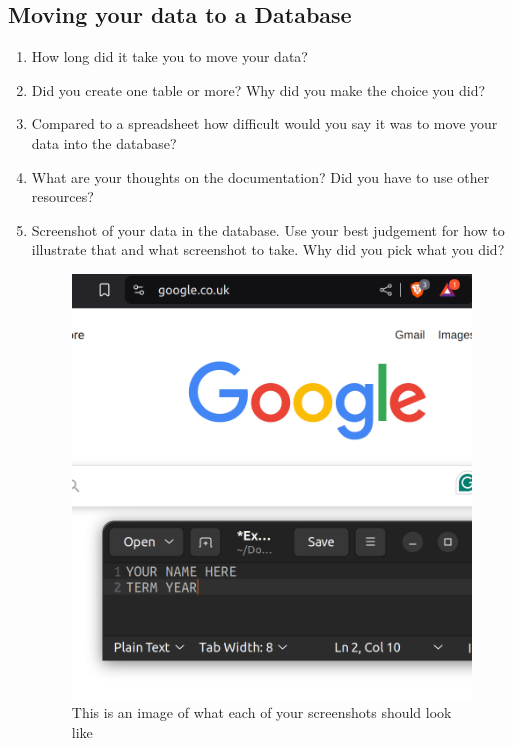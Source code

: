 \documentclass[12pt]{article}
\begin{document}
\subsection*{Moving your data to a Database}
    \begin{enumerate}
        \item How long did it take you to move your data?
        \item Did you create one table or more? Why did you make the choice you did?
        \item Compared to a spreadsheet how difficult would you say it was to move your data into the database?
        \item What are your thoughts on the documentation? Did you have to use other resources? 
        \item Screenshot of your data in the database.  Use your best judgement for how to illustrate that and what screenshot to take.  Why did you pick what you did?
        \begin{figure}[h!]
            \centerline{\includegraphics[scale=.2]{ExampleScreenshot.png}}
            \caption{This is an image of what each of your screenshots should look like}

            \end{figure} 
    \end{enumerate}
\end{document}
